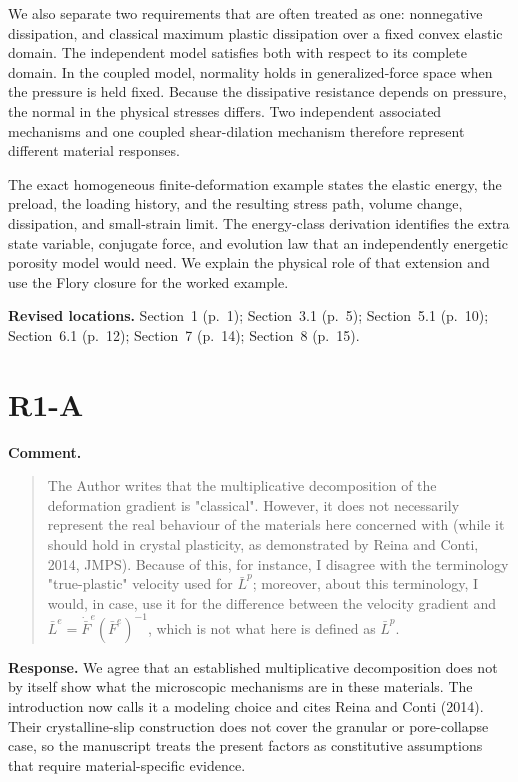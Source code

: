 \documentclass[11pt]{article}
\begin{document}
We also separate two requirements that are often treated as one: nonnegative
dissipation, and classical maximum plastic dissipation over a fixed convex
elastic domain. The independent model satisfies both with respect to its
complete domain. In the coupled model, normality holds in generalized-force
space when the pressure is held fixed. Because the dissipative resistance
depends on pressure, the normal in the physical stresses differs. Two
independent associated mechanisms and one coupled shear-dilation mechanism
therefore represent different material responses.

The exact homogeneous finite-deformation example states the elastic energy, the
preload, the loading history, and the resulting stress path, volume change,
dissipation, and small-strain limit. The energy-class derivation identifies the
extra state variable, conjugate force, and evolution law that an independently
energetic porosity model would need. We explain the physical role of that
extension and use the Flory closure for the worked example.

\textbf{Revised locations.} Section~1 (p.~1); Section~3.1 (p.~5); Section~5.1 (p.~10); Section~6.1 (p.~12); Section~7 (p.~14); Section~8 (p.~15).
\section{R1-A}
\textbf{Comment.}\begin{quote}\small
The Author writes that the multiplicative decomposition of the deformation gradient is "classical". However, it does not necessarily represent the real behaviour of the materials here concerned with (while it should hold in crystal plasticity, as demonstrated by Reina and Conti, 2014, JMPS). Because of this, for instance, I disagree with the terminology "true-plastic" velocity used for \(\bar L^p\); moreover, about this terminology, I would, in case, use it for the difference between the velocity gradient and \(\bar L^e=\dot{\bar F}^e(\bar F^e)^{-1}\), which is not what here is defined as \(\bar L^p\).
\end{quote}
\textbf{Response.} We agree that an established multiplicative decomposition
does not by itself show what the microscopic mechanisms are in these materials.
The introduction now calls it a modeling choice and cites Reina and Conti
(2014). Their crystalline-slip construction does not cover the granular or
pore-collapse case, so the manuscript treats the present factors as
constitutive assumptions that require material-specific evidence.
\end{document}
